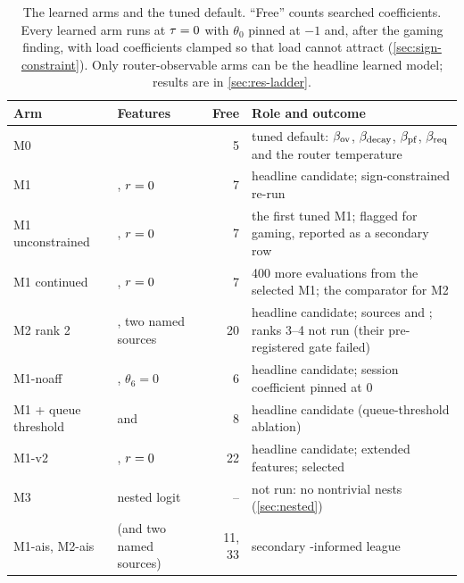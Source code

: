 \begin{table}[tbp]
  \centering\small
  \caption{The learned arms and the tuned default. ``Free'' counts searched coefficients. Every
    learned arm runs at $\temp = 0$ with $\theta_0$ pinned at $-1$ and, after the gaming finding,
    with load coefficients clamped so that load cannot attract (\cref{sec:sign-constraint}). Only
    router-observable arms can be the headline learned model; results are in
    \cref{sec:res-ladder}.}
  \label{tab:ladder}
  \begin{tabularx}{\linewidth}{@{}llrY@{}}
    \toprule
    Arm & Features & Free & Role and outcome \\
    \midrule
    M0 &  & 5 & tuned default: $\beta_{\mathrm{ov}}$, $\beta_{\mathrm{decay}}$, $\beta_{\mathrm{pf}}$, $\beta_{\mathrm{req}}$ and the router
      temperature \\
    M1 & , $r = 0$ & 7 & headline candidate; sign-constrained re-run \\
    M1 unconstrained & , $r = 0$ & 7 & the first tuned M1; flagged for gaming,
      reported as a secondary row \\
    M1 continued & , $r = 0$ & 7 & 400 more evaluations from the selected M1; the
      comparator for M2 \\
    M2 rank 2 & , two named sources & 20 & headline candidate; sources  and
      ; ranks 3--4 not run (their pre-registered gate
      failed) \\
    M1-noaff & , $\theta_6 = 0$ & 6 & headline candidate; session coefficient pinned
      at 0 \\
    M1 + queue threshold &  and  & 8 & headline candidate
      (queue-threshold ablation) \\
    M1-v2 & , $r = 0$ & 22 & headline candidate; extended features; selected \\
    M3 & nested logit & -- & not run: no nontrivial nests (\cref{sec:nested}) \\
    \midrule
    M1-ais, M2-ais &  (and two named sources) & 11, 33 & secondary \ais{}-informed
      league \\
    \bottomrule
  \end{tabularx}
\end{table}

